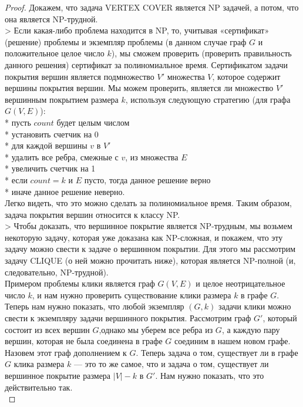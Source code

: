     \begin{proof}
        Докажем, что задача VERTEX COVER является NP задачей, а потом, что она является NP-трудной.\\
        > Если какая-либо проблема находится в NP, то, учитывая «сертификат» (решение) проблемы и экземпляр проблемы (в данном случае граф $G$ и положительное целое число $k$), мы сможем проверить (проверить правильность данного решения) сертификат за полиномиальное время.
        Сертификатом задачи покрытия вершин является подмножество $V'$ множества $V$, которое содержит вершины покрытия вершин. Мы можем проверить, является ли множество $V'$ вершинным покрытием размера $k$, используя следующую стратегию (для графа $G(V, E)$):\\
        * пусть $count$ будет целым числом\\
        * установить счетчик на 0\\
        * для каждой вершины $v$ в $V'$\\
        * удалить все ребра, смежные с $v$, из множества $E$\\
        * увеличить счетчик на 1\\
        * если $count = k$ и $E$ пусто, тогда данное решение верно\\
        * иначе данное решение неверно.\\
        Легко видеть, что это можно сделать за полиномиальное время. Таким образом, задача покрытия вершин относится к классу NP.\\
        > Чтобы доказать, что вершинное покрытие является NP-трудным, мы возьмем некоторую задачу, которая уже доказана как NP-сложная, и покажем, что эту задачу можно свести к задаче о вершинном покрытии. Для этого мы рассмотрим задачу CLIQUE (о ней можно прочитать ниже), которая является NP-полной (и, следовательно, NP-трудной).\\
        Примером проблемы клики является граф $G(V, E)$ и целое неотрицательное число $k$, и нам нужно проверить существование клики размера $k$ в графе $G$.\\
        Теперь нам нужно показать, что любой экземпляр $(G, k)$ задачи клики можно свести к экземпляру задачи вершинного покрытия. Рассмотрим граф $G'$, который состоит из всех вершин $G$,однако мы уберем все ребра из $G$, а каждую пару вершин, которая не была соединена в графе $G$ соединим в нашем новом графе. Назовем этот граф дополнением к $G$. Теперь задача о том, существует ли в графе $G$ клика размера $k$ --- это то же самое, что и задача о том, существует ли вершинное покрытие размера $|V| - k$ в $G'$. Нам нужно показать, что это действительно так.\\

\end{proof}
